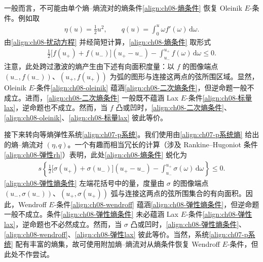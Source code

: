 \documentclass[../../main.tex]{subfiles}
\begin{document}
一般而言，不可能由单个熵--熵流对的熵条件\eqref{align:ch08-熵条件} 恢复 Oleinik $E$-条件。例如取
\begin{align}
\eta(u)=\tfrac12 u^2,\qquad q(u)=\int_0^u \omega f'(\omega)\,\mathrm{d}\omega.
\label{align:ch08-二次熵}
\end{align}
由\eqref{align:ch08-扰动方程} 并经简短计算，\eqref{align:ch08-熵条件} 取形式
\begin{align}
\tfrac12\big[f(u_+)+f(u_-)\big](u_+-u_-)-\int_{u_-}^{u_+}f(\omega)\,\mathrm{d}\omega\leqslant0.
\label{align:ch08-二次熵条件}
\end{align}
注意，此处跨过激波的熵产生由下述有向面积度量：以 $f$ 的图像端点 $(u_-,f(u_-))$、$(u_+,f(u_+))$ 为弧的图形与连接这两点的弦所围区域。显然，Oleinik $E$-条件\eqref{align:ch08-oleinik} 蕴涵\eqref{align:ch08-二次熵条件}，但逆命题一般不成立。进而，\eqref{align:ch08-二次熵条件} 一般既不蕴涵 Lax $E$-条件\eqref{align:ch08-标量lax}，逆命题也不成立。然而，当 $f$ 凸或凹时，\eqref{align:ch08-二次熵条件}、\eqref{align:ch08-oleinik}、\eqref{align:ch08-标量lax} 彼此等价。

接下来转向等熵弹性系统\eqref{align:ch07-p系统}。我们使用由\eqref{align:ch07-p系统熵} 给出的熵--熵流对 $(\eta,q)$。一个有趣而相当冗长的计算（涉及 Rankine--Hugoniot 条件\eqref{align:ch08-弹性rh}）表明，此处\eqref{align:ch08-熵条件} 蜕化为
\begin{align}
s\left\{\tfrac12\big[\sigma(u_+)+\sigma(u_-)\big](u_+-u_-)-\int_{u_-}^{u_+}\sigma(\omega)\,\mathrm{d}\omega\right\}\leqslant0.
\label{align:ch08-弹性熵条件}
\end{align}
\eqref{align:ch08-弹性熵条件} 左端花括号中的量，度量由 $\sigma$ 的图像端点 $(u_-,\sigma(u_-))$、$(u_+,\sigma(u_+))$ 弧与连接这两点的弦所围集合的有向面积。因此，Wendroff $E$-条件\eqref{align:ch08-wendroff} 蕴涵\eqref{align:ch08-弹性熵条件}，但逆命题一般不成立。条件\eqref{align:ch08-弹性熵条件} 未必蕴涵 Lax $E$-条件\eqref{align:ch08-弹性lax}，逆命题也不必然成立。然而，当 $\sigma$ 凸或凹时，\eqref{align:ch08-弹性熵条件}、\eqref{align:ch08-wendroff}、\eqref{align:ch08-弹性lax} 彼此等价。当然，系统\eqref{align:ch07-p系统} 配有丰富的熵集，故可使用附加熵--熵流对从熵条件恢复 Wendroff $E$-条件，但此处不作尝试。
\end{document}
